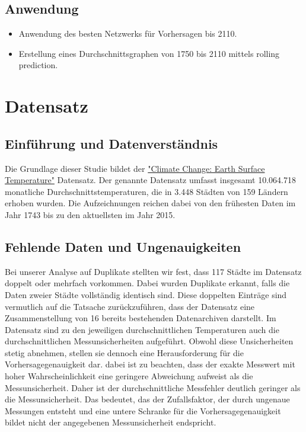 \documentclass[manuscript,screen,review]{acmart}
\begin{document}
\subsection*{Anwendung}
\begin{itemize}
    \item Anwendung des besten Netzwerks für Vorhersagen bis 2110.
    \item Erstellung eines Durchschnittsgraphen von 1750 bis 2110 mittels rolling prediction.
\end{itemize}

\section{Datensatz}
\subsection{Einführung und Datenverständnis}
Die Grundlage dieser Studie bildet der \href{https://www.kaggle.com/datasets/berkeleyearth/climate-change-earth-surface-temperature-data?select=GlobalLandTemperaturesByCity.csv}{"Climate Change: Earth Surface Temperature"} Datensatz.
Der genannte Datensatz umfasst insgesamt 10.064.718 monatliche Durchschnittstemperaturen, die in 3.448 Städten von 159 Ländern erhoben wurden. Die Aufzeichnungen reichen dabei von den frühesten Daten im Jahr 1743 bis zu den aktuellsten im Jahr 2015.

\subsection{Fehlende Daten und Ungenauigkeiten}
Bei unserer Analyse auf Duplikate stellten wir fest, dass 117 Städte im Datensatz doppelt oder mehrfach vorkommen. Dabei wurden Duplikate erkannt, falls die Daten zweier Städte vollständig identisch sind.  Diese doppelten Einträge sind vermutlich auf die Tatsache zurückzuführen, dass der Datensatz eine Zusammenstellung von 16 bereits bestehenden Datenarchiven darstellt. Im Datensatz sind zu den jeweiligen durchschnittlichen Temperaturen auch die durchschnittlichen Messunsicherheiten aufgeführt. Obwohl diese Unsicherheiten stetig abnehmen, stellen sie dennoch eine Herausforderung für die Vorhersagegenauigkeit dar. dabei ist zu beachten, dass der exakte Messwert mit hoher Wahrscheinlichkeit eine geringere Abweichung aufweist als die Messunsicherheit. Daher ist der durchschnittliche Messfehler deutlich geringer als die Messunsicherheit.
Das bedeutet, das der Zufallsfaktor, der durch ungenaue Messungen entsteht und eine untere Schranke für die Vorhersagegenauigkeit bildet nicht der angegebenen Messunsicherheit endspricht.
\end{document}
